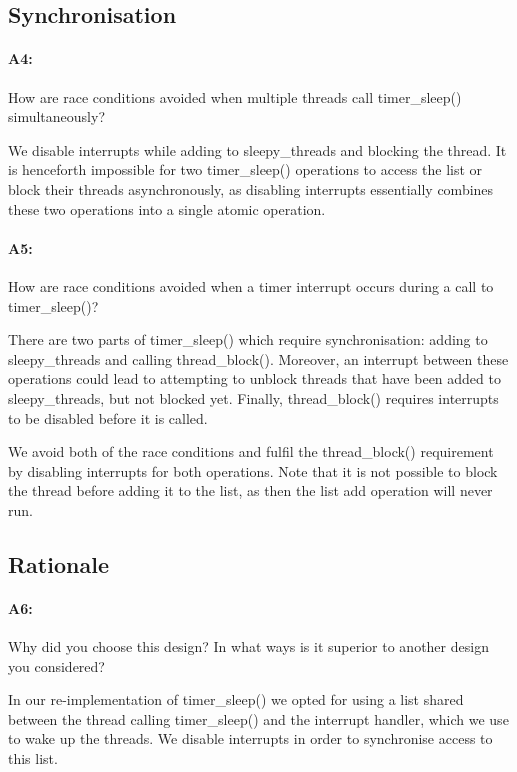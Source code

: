 \documentclass[11pt]{article}
\begin{document}
\subsection{Synchronisation}
\paragraph{A4:}
How are race conditions avoided when multiple threads call timer\_sleep() simultaneously?

We disable interrupts while adding to sleepy\_threads and blocking the thread. It is henceforth impossible for two timer\_sleep() operations to access the list or block their threads asynchronously, as disabling interrupts essentially combines these two operations into a single atomic operation.

\paragraph{A5:}
How are race conditions avoided when a timer interrupt occurs during a call to timer\_sleep()?

There are two parts of timer\_sleep() which require synchronisation: adding to sleepy\_threads and calling thread\_block(). Moreover, an interrupt between these operations could lead to attempting to unblock threads that have been added to sleepy\_threads, but not blocked yet. Finally, thread\_block() requires interrupts to be disabled before it is called.

We avoid both of the race conditions and fulfil the thread\_block() requirement by disabling interrupts for both operations. Note that it is not possible to block the thread before adding it to the list, as then the list add operation will never run.

\subsection{Rationale}
\paragraph{A6:}
Why did you choose this design? In what ways is it superior to another design you considered?

In our re-implementation of timer\_sleep() we opted for using a list shared between the thread calling timer\_sleep() and the interrupt handler, which we use to wake up the threads. We disable interrupts in order to synchronise access to this list.
\end{document}
